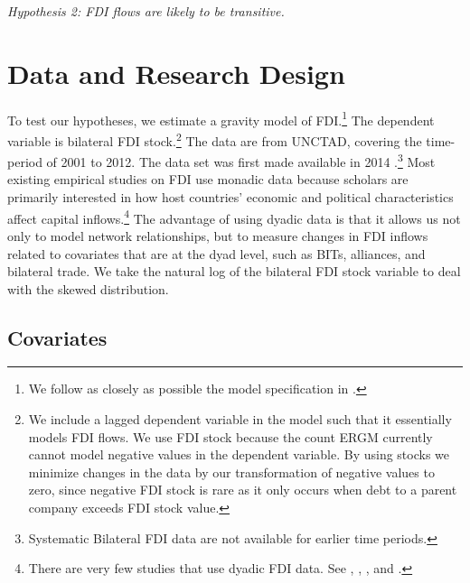 \documentclass[reqno,onecolumn,letterpaper,12pt]{article}
\begin{document}
\begin{center}
\textit{Hypothesis 2: FDI flows are likely to be transitive.}
\end{center}




\section{Data and Research Design}


To test our hypotheses, we estimate a gravity model of FDI.\footnote{We follow as closely as possible the model specification in \citet{Li_Vashchilko:2010}.} The dependent variable is bilateral FDI stock.\footnote{We include a lagged dependent variable in the model such that it essentially models FDI flows. We use FDI stock because the count ERGM currently cannot model negative values in the dependent variable. By using stocks we minimize changes in the data by our transformation of negative values to zero, since negative FDI stock is rare as it only occurs when debt to a parent company exceeds FDI stock value.} The data are from UNCTAD, covering the time-period of 2001 to 2012. The data set was first made available in 2014 \citep{UNCTAD:2014}.\footnote{Systematic Bilateral FDI data are not available for earlier time periods.} Most existing empirical studies on FDI use monadic data because scholars are primarily interested in how host countries' economic and political characteristics affect capital inflows.\footnote{There are very few studies that use dyadic FDI data. See \citet{Frenkel_et_al:2004}, \citet{Leblang:2010}, \citet{Li_Vashchilko:2010}, and \citet{Razin_et_al:2005}. } The advantage of using dyadic data is that it allows us not only to model network relationships, but to measure changes in FDI inflows related to covariates that are at the dyad level, such as BITs, alliances, and bilateral trade. We take the natural log of the bilateral FDI stock variable to deal with the skewed distribution.


\subsection{Covariates}
\end{document}
